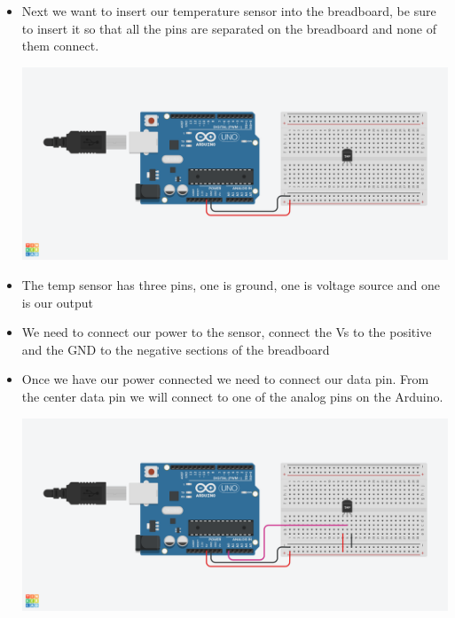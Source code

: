 \documentclass[12pt]{article}
\begin{document}
\begin{itemize}
		\item Next we want to insert our temperature sensor into the breadboard, be sure to insert it so that all the pins are separated on the breadboard and none of them connect.
		\begin{center}
			\includegraphics[scale = 0.3]{./Images/circuit2}
		\end{center}
		\item The temp sensor has three pins, one is ground, one is voltage source and one is our output
		\item We need to connect our power to the sensor, connect the Vs to the positive and the GND to the negative sections of the breadboard
		\item Once we have our power connected we need to connect our data pin. From the center data pin we will connect to one of the analog pins on the Arduino. 
		\begin{center}
			\includegraphics[scale = 0.3]{./Images/circuit3}
		\end{center}
	\end{itemize}
	
	\newpage






 
\end{document}

